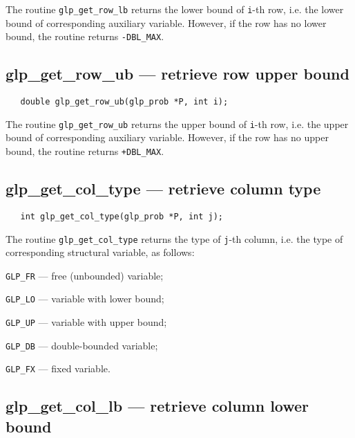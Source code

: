 \returns

The routine \verb|glp_get_row_lb| returns the lower bound of
\verb|i|-th row, i.e. the lower bound of corresponding auxiliary
variable. However, if the row has no lower bound, the routine returns
\verb|-DBL_MAX|.

\vspace*{-4pt}

\subsection{glp\_get\_row\_ub --- retrieve row upper bound}

\synopsis

\begin{verbatim}
   double glp_get_row_ub(glp_prob *P, int i);
\end{verbatim}

\returns

The routine \verb|glp_get_row_ub| returns the upper bound of
\verb|i|-th row, i.e. the upper bound of corresponding auxiliary
variable. However, if the row has no upper bound, the routine returns
\verb|+DBL_MAX|.

\vspace*{-4pt}

\subsection{glp\_get\_col\_type --- retrieve column type}

\synopsis

\begin{verbatim}
   int glp_get_col_type(glp_prob *P, int j);
\end{verbatim}

\returns

The routine \verb|glp_get_col_type| returns the type of \verb|j|-th
column, i.e. the type of corresponding structural variable, as follows:

\verb|GLP_FR| --- free (unbounded) variable;

\verb|GLP_LO| --- variable with lower bound;

\verb|GLP_UP| --- variable with upper bound;

\verb|GLP_DB| --- double-bounded variable;

\verb|GLP_FX| --- fixed variable.

\vspace*{-4pt}

\subsection{glp\_get\_col\_lb --- retrieve column lower bound}

